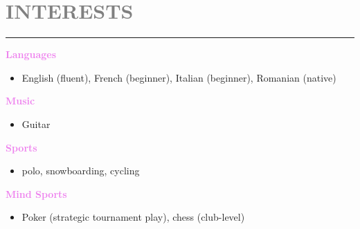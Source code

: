 \documentclass[10pt,a4paper]{article}
\newcommand{\myrule}{\noindent\rule{\linewidth}{0.4pt}}
\begin{document}
\vspace{0.1cm}

\section*{\textcolor{gray}{INTERESTS}}
\myrule

\textbf{\textcolor{violet}{Languages}} \\[-3.0ex]
\begin{itemize}
  \item English (fluent), French (beginner), Italian (beginner), Romanian (native)
\end{itemize}

\textbf{\textcolor{violet}{Music}} \\[-3.0ex]
\begin{itemize}
  \item Guitar
\end{itemize}

\textbf{\textcolor{violet}{Sports}} \\[-3.0ex]
\begin{itemize}
  \item polo, snowboarding, cycling
\end{itemize}

\textbf{\textcolor{violet}{Mind Sports}} \\[-3.0ex]
\begin{itemize}
  \item Poker (strategic tournament play), chess (club-level)
\end{itemize}
\end{document}
